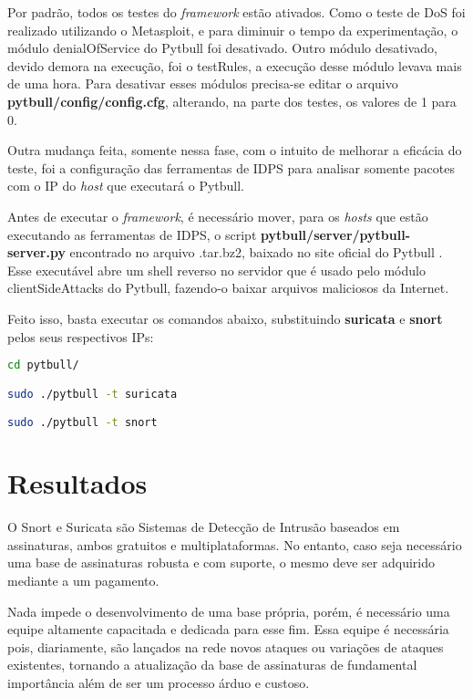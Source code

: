 Por padrão, todos os testes do \textit{framework} estão ativados. Como o teste de DoS foi realizado utilizando o Metasploit, e para diminuir o tempo da experimentação, o módulo denialOfService do Pytbull foi desativado. Outro módulo desativado, devido demora na execução, foi o testRules, a execução desse módulo levava mais de uma hora. Para desativar esses módulos precisa-se editar o arquivo \textbf{pytbull/config/config.cfg}, alterando, na parte dos testes, os valores de 1 para 0.

Outra mudança feita, somente nessa fase, com o intuito de melhorar a eficácia do teste, foi a configuração das ferramentas de IDPS para analisar somente pacotes com o IP do \textit{host} que executará o Pytbull. 

Antes de executar o \textit{framework}, é necessário mover, para os \textit{hosts} que estão executando as ferramentas de IDPS, o script \textbf{pytbull/server/pytbull-server.py} encontrado no arquivo .tar.bz2, baixado no site oficial do Pytbull \cite{pytbull}. Esse executável abre um shell reverso no servidor que é usado pelo módulo clientSideAttacks do Pytbull, fazendo-o baixar arquivos maliciosos da Internet. 

Feito isso, basta executar os comandos abaixo, substituindo \textbf{suricata} e \textbf{snort} pelos seus respectivos IPs:

\begin{lstlisting}[title={Comandos usados para execução do Pytbull}, language=bash, frame=single, label={lst:pytbull}]
cd pytbull/

sudo ./pytbull -t suricata

sudo ./pytbull -t snort
\end{lstlisting}

\section{Resultados} \label{sec:resultados}

O Snort e Suricata são Sistemas de Detecção de Intrusão baseados em assinaturas, ambos gratuitos e multiplataformas. No entanto, caso seja necessário uma base de assinaturas robusta e com suporte, o mesmo deve ser adquirido mediante a um pagamento. 

Nada impede o desenvolvimento de uma base própria, porém, é necessário uma equipe altamente capacitada e dedicada para esse fim. Essa equipe é necessária pois, diariamente, são lançados na rede novos ataques ou variações de ataques existentes, tornando a atualização da base de assinaturas de fundamental importância além de ser um processo árduo e custoso.


